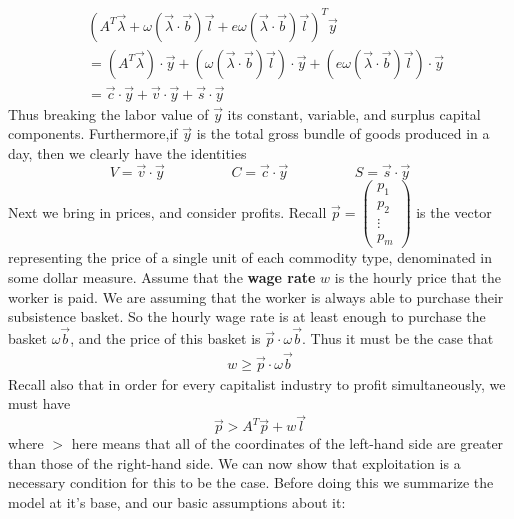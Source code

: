 \begin{align*}
	& (A^T\vec{\lambda} + \omega(\vec{\lambda}\cdot\vec{b})\vec{l} + e\omega(\vec{\lambda}\cdot\vec{b})\vec{l})^T\vec{y}  \\
	&= (A^T\vec{\lambda})\cdot\vec{y} + (\omega(\vec{\lambda}\cdot\vec{b})\vec{l})\cdot \vec{y} + (e\omega(\vec{\lambda}\cdot\vec{b})\vec{l})\cdot\vec{y} \\
	&= \vec{c} \cdot \vec{y} + \vec{v}\cdot \vec{y} + \vec{s}\cdot \vec{y}
\end{align*}
Thus breaking the labor value of $\vec{y}$ its constant, variable, and surplus capital components. Furthermore,if $\vec{y}$ is the total gross bundle of goods produced in a day, then we clearly have the identities
\[ V = \vec{v} \cdot \vec{y} \hspace{2cm} C = \vec{c}\cdot \vec{y} \hspace{2cm} S = \vec{s}\cdot \vec{y} \]  
Next we bring in prices, and consider profits. Recall $\vec{p} = \begin{pmatrix} p_1 \\ p_2 \\ \vdots \\ p_m \end{pmatrix}$ is the vector representing the price of a single unit of each commodity type, denominated in some dollar measure. Assume that the \textbf{wage rate} $w$ is the hourly price that the worker is paid. We are assuming that the worker is always able to purchase their subsistence basket. So the hourly wage rate is at least enough to purchase the basket $\omega \vec{b}$, and the price of this basket is $\vec{p} \cdot \omega \vec{b}$. Thus it must be the case that
\begin{align}
	w \geq \vec{p} \cdot \omega \vec{b}  \label{suffWages}
\end{align} 
 Recall also that in order for every capitalist industry to profit simultaneously, we must have 
 \[ \vec{p} > A^T\vec{p} + w\vec{l} \]
where $>$ here means that all of the coordinates of the left-hand side are greater than those of the right-hand side. We can now show that exploitation is a necessary condition for this to be the case. Before doing this we summarize the model at it's base, and our basic assumptions about it: \par 

